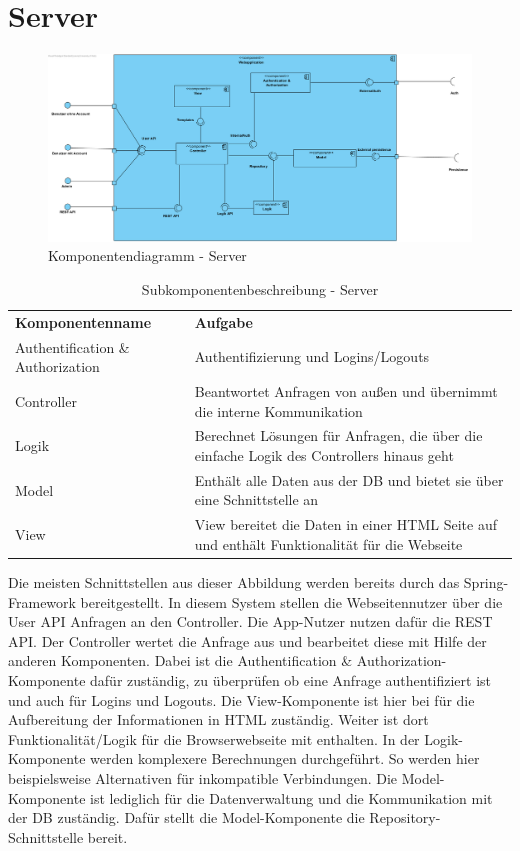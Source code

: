 \section{Server}
\begin{figure}[h]
	\centering
	\includegraphics[width=\textwidth]{komponentendiagramm/Server}
	\caption{Komponentendiagramm - Server}
	\label{fig:komponentendiagramm-server}
\end{figure}

\begin{table}[h]
	\centering
	\begin{tabularx}{\textwidth}{X X}
		\rowcolor[HTML]{C0C0C0}
		\textbf{Komponentenname} & \textbf{Aufgabe} \\
		Authentification \& Authorization & Authentifizierung und Logins/Logouts\\
		\rowcolor[HTML]{E7E7E7}
		Controller & Beantwortet Anfragen von außen und übernimmt die interne Kommunikation\\
		Logik & Berechnet Lösungen für Anfragen, die über die einfache Logik des Controllers hinaus geht\\
		\rowcolor[HTML]{E7E7E7}
		Model & Enthält alle Daten aus der DB und bietet sie über eine Schnittstelle an\\
		View & View bereitet die Daten in einer HTML Seite auf und enthält Funktionalität für die Webseite
	\end{tabularx}
	\caption{Subkomponentenbeschreibung - Server}
	\label{table:Subkomponentenbeschreibung - server}
\end{table}

\FloatBarrier
Die meisten Schnittstellen aus dieser Abbildung werden bereits durch das Spring-Framework bereitgestellt.
In diesem System stellen die Webseitennutzer über die User API Anfragen an den Controller.
Die App-Nutzer nutzen dafür die REST API.
Der Controller wertet die Anfrage aus und bearbeitet diese mit Hilfe der anderen Komponenten.
Dabei ist die Authentification \& Authorization-Komponente dafür zuständig, zu überprüfen ob eine Anfrage authentifiziert ist und auch für Logins und Logouts.
Die View-Komponente ist hier bei für die Aufbereitung der Informationen in HTML zuständig. Weiter ist dort Funktionalität/Logik für die Browserwebseite mit enthalten.
In der Logik-Komponente werden komplexere Berechnungen durchgeführt.
So werden hier beispielsweise Alternativen für inkompatible Verbindungen.
Die Model-Komponente ist lediglich für die Datenverwaltung und die Kommunikation mit der DB zuständig.
Dafür stellt die Model-Komponente die Repository-Schnittstelle bereit.


